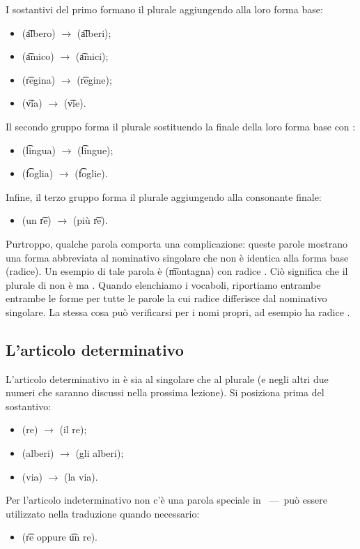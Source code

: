 I sostantivi del primo formano il plurale aggiungendo  alla loro forma
base:
\begin{itemize}
  \item {} (\t{albero}) $\rightarrow$  (\t{alberi});
  \item {} (\t{amico}) $\rightarrow$  (\t{amici});
  \item {} (\t{regina}) $\rightarrow$  (\t{regine});
  \item {} (\t{via}) $\rightarrow$  (\t{vie}).
\end{itemize}
Il secondo gruppo forma il plurale sostituendo la  finale della loro
forma base con :
\begin{itemize}
  \item {} (\t{lingua}) $\rightarrow$  (\t{lingue});
  \item {} (\t{foglia}) $\rightarrow$  (\t{foglie}).
\end{itemize}
Infine, il terzo gruppo forma il plurale aggiungendo  alla consonante
finale:
\begin{itemize}
  \item {} (un \t{re}) $\rightarrow$  (più \t{re}).
\end{itemize}
Purtroppo, qualche parola comporta una complicazione: queste parole mostrano una
forma abbreviata al nominativo singolare che non è identica alla forma base
(radice). Un esempio di tale parola è  (\t{montagna}) con radice
.
Ciò significa che il plurale di  non è  ma .
Quando elenchiamo i vocaboli, riportiamo entrambe entrambe le forme per tutte le
parole la cui radice differisce dal nominativo singolare. La stessa cosa può
verificarsi per i nomi propri, ad esempio  ha radice .

\subsection{L'articolo determinativo}
L'articolo determinativo in \quenya è  sia al singolare che al plurale
(e negli altri due numeri che saranno discussi nella prossima lezione).
Si posiziona prima del sostantivo:
\begin{itemize}
  \item {} (re) $\rightarrow$  (il re);
  \item {} (alberi) $\rightarrow$  (gli alberi);
  \item {} (via) $\rightarrow$  (la via).
\end{itemize}
Per l'articolo indeterminativo non c'è una parola speciale in \quenya~---~può
essere utilizzato nella traduzione quando necessario:
\begin{itemize}
  \item {} (\t{re} oppure \t{un re}).
\end{itemize}

